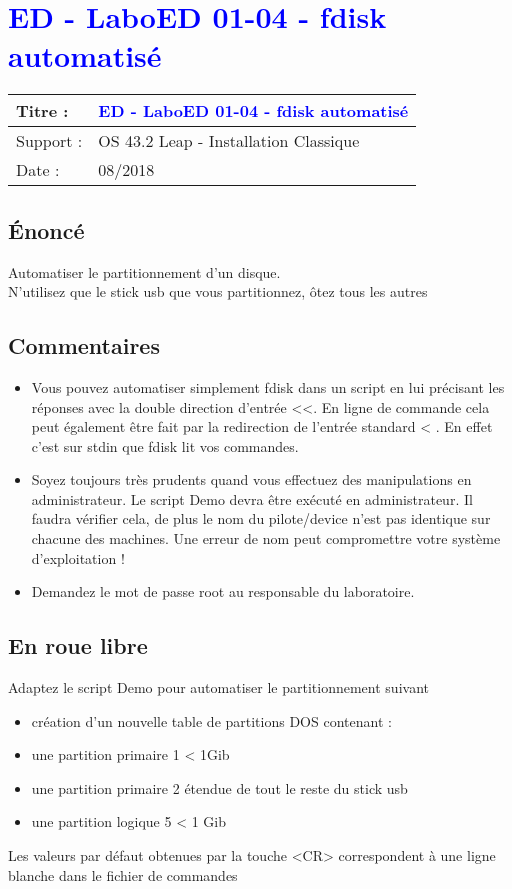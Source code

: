 \lstset{language=c}
\renewcommand{\titre}{\textcolor{blue}{ ED - LaboED 01-04 - fdisk automatisé}}

\lhead{ \titre }
\section{{\titre} }

\begin{tabular}{|l|l|}
\hline
Titre : 	& \titre \\\hline
Support : 	& OS 43.2 Leap - Installation Classique \\\hline
Date :		& 08/2018\\\hline
\end{tabular}

\subsection{Énoncé}

Automatiser le partitionnement d'un disque. \\


N'utilisez que le stick usb que vous partitionnez, ôtez tous les autres

\subsection{Commentaires}

\begin{itemize}
\item Vous pouvez automatiser simplement fdisk dans un script en lui précisant les réponses avec la double direction d'entrée <<. En ligne de commande cela peut également être fait par la redirection de l'entrée standard < . En effet c'est sur stdin que fdisk lit vos commandes. 
\item Soyez toujours très prudents quand vous effectuez des manipulations en administrateur. Le script Demo devra être exécuté en administrateur. Il faudra vérifier cela, de plus le nom du pilote/device n'est pas identique sur chacune des machines. Une erreur de nom peut compromettre votre système d'exploitation !
\item Demandez le mot de passe root au responsable du laboratoire.
\end{itemize}

\subsection{En roue libre}
Adaptez le script Demo pour automatiser le partitionnement suivant

\begin{itemize}
\item création d'un nouvelle table de partitions DOS contenant :
\item une partition primaire 1 < 1Gib
\item une partition primaire 2 étendue de tout le reste du stick usb
\item une partition logique 5 < 1 Gib
\end{itemize}
Les valeurs par défaut obtenues par la touche <CR>  correspondent à une ligne blanche dans le fichier de commandes 
\newpage
